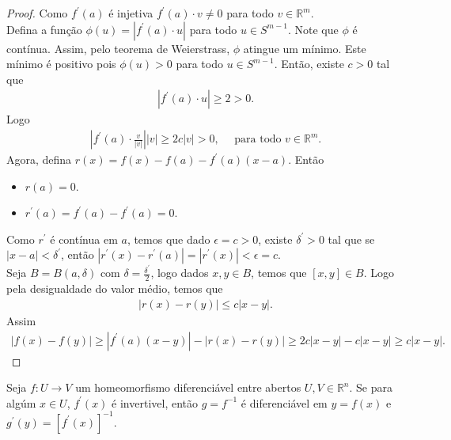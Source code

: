 \begin{proof} 
  Como $f^{\prime}(a)$ é injetiva $f^{\prime}(a)\cdot v\neq 0$ para todo $v\in\mathbb{R}^{m}$.\\
  Defina a função $\phi(u)=|f^{\prime}(a)\cdot u|$ para todo $u\in S^{m-1}$. Note que $\phi$ é contínua. Assim, pelo teorema de Weierstrass, $\phi$ atingue um mínimo. Este mínimo é positivo pois $\phi(u)>0$ para todo $u\in S^{m-1}$. Então, existe $c>0$ tal que
  \begin{align*}
    |f^{\prime}(a)\cdot u|\geq 2>0.
  \end{align*}
  Logo
  \begin{align*}
    |f^{\prime}(a)\cdot \frac{v}{|v|}||v|\geq 2c|v|>0,\quad\text{ para todo }v\in\mathbb{R}^{m}.
  \end{align*}
  Agora, defina $r(x)=f(x)-f(a)-f^{\prime}(a)(x-a)$. Então
  \begin{itemize}
    \item $r(a)=0$.
    \item $r^{\prime}(a)=f^{\prime}(a)-f^{\prime}(a)=0$.
  \end{itemize}
  Como $r^{\prime}$ é contínua em $a$, temos que dado $\epsilon=c>0$, existe $\delta^{\prime}>0$ tal que se $|x-a|<\delta^{\prime}$, então $|r^{\prime}(x)-r^{\prime}(a)|=|r^{\prime}(x)|<\epsilon=c$.\\
  Seja $B=B(a,\delta)$ com $\delta=\frac{\delta^{\prime}}{2}$, logo dados $x,y\in B$, temos que $[x,y]\in B$. Logo pela desigualdade do valor médio, temos que
  \begin{align*}
    |r(x)-r(y)|\leq c|x-y|.
  \end{align*}
  Assim
  \begin{align*}
    |f(x)-f(y)|\geq|f^{\prime}(a)(x-y)|-|r(x)-r(y)|\geq 2c|x-y|-c|x-y|\geq c|x-y|.
  \end{align*}
\end{proof}
\begin{theorem}\label{teo:3.6-teorema-difeo-inverso}
  Seja $f:U\to V$ um homeomorfismo diferenciável entre abertos $U,V\in\mathbb{R}^{n}$. Se para algúm $x\in U$, $f^{\prime}(x)$ é invertivel, então $g=f^{-1}$ é diferenciável em $y=f(x)$ e $g^{\prime}(y)=\left[ f^{\prime}(x) \right]^{-1}$. 
\end{theorem}
